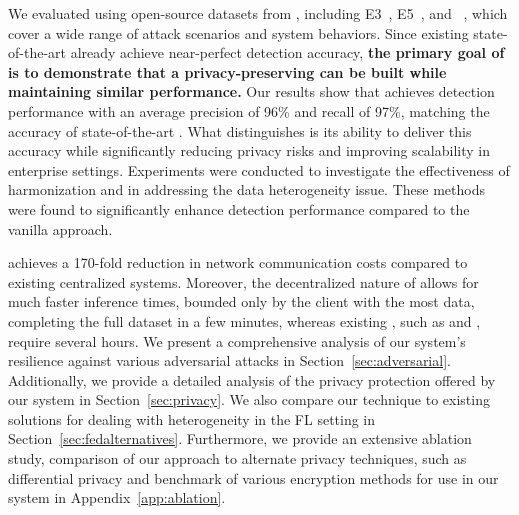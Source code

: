 We evaluated \Sys using open-source datasets from \darpa, including E3~\cite{error3}, E5~\cite{bug5}, and \optc~\cite{anjum2021analyzing}, which cover a wide range of attack scenarios and system behaviors. Since existing state-of-the-art \pids already achieve near-perfect detection accuracy, {\bf the primary goal of \Sys is to demonstrate that a privacy-preserving \pids can be built while maintaining similar performance.} Our results show that \Sys achieves detection performance with an average precision of 96\% and recall of 97\%, matching the accuracy of state-of-the-art \pids. What distinguishes \Sys is its ability to deliver this accuracy while significantly reducing privacy risks and improving scalability in enterprise settings. Experiments were conducted to investigate the effectiveness of \wordvec harmonization and  in addressing the data heterogeneity issue. These methods were found to significantly enhance detection performance compared to the vanilla approach.


\Sys achieves a 170-fold reduction in network communication costs compared to existing centralized systems. Moreover, the decentralized nature of \Sys allows for much faster inference times, bounded only by the client with the most data, completing the full \optc dataset in a few minutes, whereas existing \pids, such as \flash and \kairos, require several hours. We present a comprehensive analysis of our system's resilience against various adversarial attacks in Section~\ref{sec:adversarial}. Additionally, we provide a detailed analysis of the privacy protection offered by our system in Section~\ref{sec:privacy}. We also compare our technique to existing solutions for dealing with heterogeneity in the FL setting in Section~\ref{sec:fedalternatives}. Furthermore, we provide an extensive ablation study, comparison of our approach to alternate privacy techniques, such as differential privacy and benchmark of various encryption methods for use in our system in Appendix~\ref{app:ablation}.


